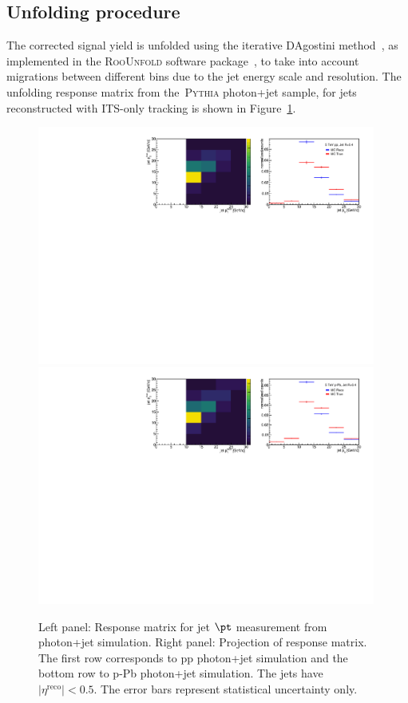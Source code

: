 \subsection{Unfolding procedure}
\label{sec:unfolding}
The corrected signal yield is unfolded using the iterative D\textquotesingle Agostini method~\cite{DAgostini:1994fjx}, as implemented in the \textsc{RooUnfold} software package~\cite{Adye:2011gm}, to take into account migrations between different bins due to the jet energy scale and resolution. The unfolding response matrix from the~\textsc{Pythia} photon+jet sample, for jets reconstructed with ITS-only tracking is shown in Figure~\ref{fig:JetPTUnfolding}.
\begin{figure}
\center
\includegraphics[width=0.99\textwidth]{JetResponse/UnfoldingMatrixpp}\\
\includegraphics[width=0.99\textwidth]{JetResponse/UnfoldingMatrixpPb}\\
\caption{Left panel: Response matrix for jet $\pt$ measurement from photon+jet simulation. Right panel: Projection of response matrix. The first row corresponds to pp photon+jet simulation and the bottom row to p-Pb photon+jet simulation. The jets have $|\eta^{\mathrm{reco}}|<0.5$. The error bars represent statistical uncertainty only.}
\label{fig:JetPTUnfolding}
\end{figure}

